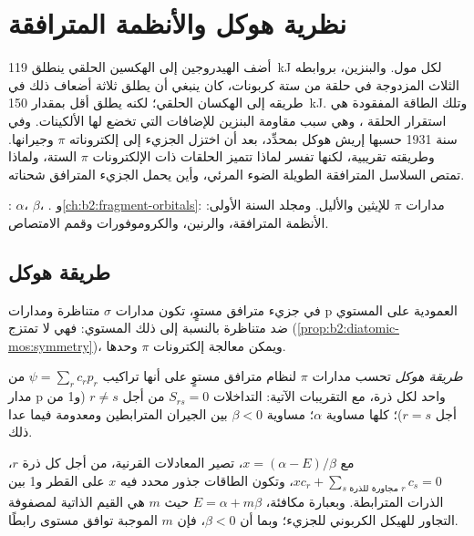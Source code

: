 \chapter{نظرية هوكل والأنظمة المترافقة}\label{ch:b2:huckel}

أضف الهيدروجين إلى الهكسين الحلقي ينطلق \qty{119}{kJ} لكل مول. والبنزين،
بروابطه الثلاث المزدوجة في حلقة من ستة كربونات، كان ينبغي أن يطلق ثلاثة أضعاف
ذلك في طريقه إلى الهكسان الحلقي؛ لكنه يطلق أقل بمقدار \qty{150}{kJ}. وتلك الطاقة
المفقودة هي استقرار الحلقة ، وهي سبب مقاومة البنزين
للإضافات التي تخضع لها الألكينات. وفي سنة 1931 حسبها إريش هوكل بمحدِّد،
بعد أن اختزل الجزيء إلى إلكتروناته $\pi$
وجيرانها. وطريقته تقريبية، لكنها تفسر لماذا تتميز الحلقات ذات الإلكترونات $\pi$ الستة،
ولماذا تمتص السلاسل المترافقة الطويلة الضوء المرئي، 
وأين يحمل الجزيء المترافق شحناته.

\begin{recall}
:  $\alpha$،  $\beta$،
. و\cref{ch:b2:fragment-orbitals}: مدارات $\pi$ للإيثين 
والأليل. ومجلد السنة الأولى: الأنظمة المترافقة، والرنين، والكروموفورات 
وقمم الامتصاص.
\end{recall}

\section{طريقة هوكل}

في جزيء مترافق مستوٍ، تكون مدارات $\sigma$ متناظرة ومدارات p
العمودية على المستوي ضد متناظرة بالنسبة إلى ذلك المستوي: فهي
لا تمتزج (\cref{prop:b2:diatomic-mos:symmetry})، ويمكن معالجة إلكترونات $\pi$
وحدها.

\begin{definition}\label{def:b2:huckel:method}
\emph{طريقة هوكل} تحسب مدارات $\pi$ لنظام
مترافق مستوٍ على أنها تراكيب $\psi = \sum_r c_r p_r$ من مدار p واحد لكل
ذرة، مع التقريبات الآتية: التداخلات $S_{rs} = 0$ من أجل $r \neq s$ (و1 من أجل $r =
s$)؛  كلها مساوية $\alpha$؛  مساوية $\beta < 0$
بين الجيران المترابطين ومعدومة فيما عدا ذلك.
\end{definition}

مع $x = (\alpha - E)/\beta$، تصير المعادلات القرنية، من أجل كل ذرة $r$،
$xc_r + \sum_{s \text{ مجاورة للذرة } r} c_s = 0$، وتكون الطاقات جذور
محدد فيه $x$ على القطر و1 بين الذرات المترابطة. وبعبارة مكافئة، $E =
\alpha + m\beta$ حيث $m$ هي القيم الذاتية لمصفوفة التجاور للهيكل
الكربوني للجزيء؛ وبما أن $\beta < 0$، فإن $m$ الموجبة توافق مستوى رابطًا.

